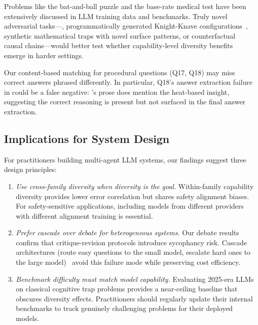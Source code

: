 Problems like the bat-and-ball puzzle and the base-rate medical test
have been extensively discussed in LLM training data and benchmarks.
Truly novel adversarial tasks---\eg, programmatically generated
Knight-Knave configurations~\citep{wu2025debate}, synthetic mathematical
traps with novel surface patterns, or counterfactual causal chains---would
better test whether capability-level diversity benefits emerge in harder settings.

Our content-based matching for procedural questions (Q17, Q18) may miss
correct answers phrased differently.
In particular, Q18's answer extraction failure in \haiku could be a false negative:
\haiku's prose does mention the heat-based insight, suggesting the correct reasoning
is present but not surfaced in the final answer extraction.

\subsection{Implications for System Design}

For practitioners building multi-agent LLM systems,
our findings suggest three design principles:

\begin{enumerate}[leftmargin=*,itemsep=2pt,topsep=2pt]
    \item \emph{Use cross-family diversity when diversity is the goal.}
          Within-family capability diversity provides lower error correlation
          but shares safety alignment biases.
          For safety-sensitive applications, including models from different
          providers with different alignment training is essential.
    \item \emph{Prefer cascade over debate for heterogeneous systems.}
          Our debate results confirm that critique-revision protocols
          introduce sycophancy risk.
          Cascade architectures (route easy questions to the small model,
          escalate hard ones to the large model)~\citep{survey2025ensemble}
          avoid this failure mode while preserving cost efficiency.
    \item \emph{Benchmark difficulty must match model capability.}
          Evaluating 2025-era LLMs on classical cognitive trap problems
          provides a near-ceiling baseline that obscures diversity effects.
          Practitioners should regularly update their internal benchmarks
          to track genuinely challenging problems for their deployed models.
\end{enumerate}

